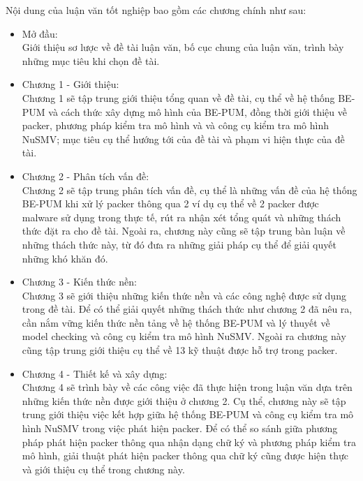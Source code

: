 Nội dung của luận văn tốt nghiệp bao gồm các chương chính như sau:

\begin{itemize}[leftmargin=*]
\item{Mở đầu:\\
\hspace*{0.5cm}Giới thiệu sơ lược về đề tài luận văn, bố cục chung của luận văn, trình bày những mục tiêu khi chọn đề tài.\\}
\item{Chương 1 - Giới thiệu:\\
\hspace*{0.5cm}Chương 1 sẽ tập trung giới thiệu tổng quan về đề tài, cụ thể về hệ thống BE-PUM và cách thức xây dựng mô hình của BE-PUM, đồng thời giới thiệu về packer, phương pháp kiểm tra mô hình và và công cụ kiểm tra mô hình NuSMV; mục tiêu cụ thể hướng tới của đề tài và phạm vi hiện thực của đề tài.\\}
\item{Chương 2 - Phân tích vấn đề:\\
\hspace*{0.5cm}Chương 2 sẽ tập trung phân tích vấn đề, cụ thể là những vấn đề của hệ thống BE-PUM khi xử lý packer thông qua 2 ví dụ cụ thể về 2 packer được malware sử dụng trong thực tế, rút ra nhận xét tổng quát và những thách thức đặt ra cho đề tài. Ngoài ra, chương này cũng sẽ tập trung bàn luận về những thách thức này, từ đó đưa ra những giải pháp cụ thể để giải quyết những khó khăn đó.\\}
\item{Chương 3 - Kiến thức nền:\\
\hspace*{0.5cm}Chương 3 sẽ giới thiệu những kiến thức nền và các công nghệ được sử dụng trong đề tài. Để có thể giải quyết những thách thức như chương 2 đã nêu ra, cần nắm vững kiến thức nền tảng về hệ thống BE-PUM và lý thuyết về model checking và công cụ kiểm tra mô hình NuSMV. Ngoài ra chương này cũng tập trung giới thiệu cụ thể về 13 kỹ thuật được hỗ trợ trong packer.\\}
\item{Chương 4 - Thiết kế và xây dựng:\\
\hspace*{0.5cm}Chương 4 sẽ trình bày về các công việc đã thực hiện trong luận văn dựa trên những kiến thức nền được giới thiệu ở chương 2. Cụ thể, chương này sẽ tập trung giới thiệu việc kết hợp giữa hệ thống BE-PUM và công cụ kiểm tra mô hình NuSMV trong việc phát hiện packer. Để có thể so sánh giữa phương pháp phát hiện packer thông qua nhận dạng chữ ký và phương pháp kiểm tra mô hình, giải thuật phát hiện packer thông qua chữ ký cũng được hiện thực và giới thiệu cụ thể trong chương này.\\}

\end{itemize}
